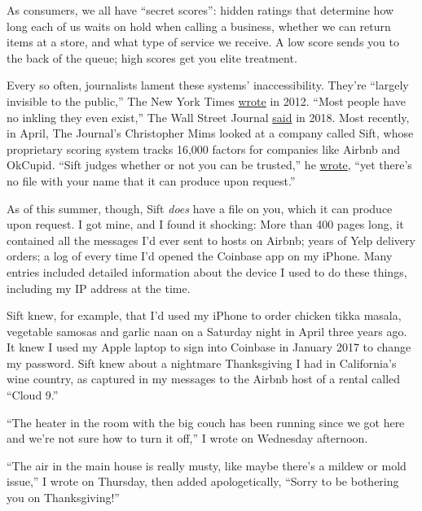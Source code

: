 As consumers, we all have ``secret scores'': hidden ratings that
determine how long each of us waits on hold when calling a business,
whether we can return items at a store, and what type of service we
receive. A low score sends you to the back of the queue; high scores get
you elite treatment.

Every so often, journalists lament these systems' inaccessibility.
They're ``largely invisible to the public,'' The New York Times
\href{https://www.nytimes3xbfgragh.onion/2012/08/19/business/electronic-scores-rank-consumers-by-potential-value.html}{wrote}
in 2012. ``Most people have no inkling they even exist,'' The Wall
Street Journal
\href{https://www.wsj.com/articles/on-hold-for-45-minutes-it-might-be-your-secret-customer-score-1541084656}{said}
in 2018. Most recently, in April, The Journal's Christopher Mims looked
at a company called Sift, whose proprietary scoring system tracks 16,000
factors for companies like Airbnb and OkCupid. ``Sift judges whether or
not you can be trusted,'' he
\href{https://www.wsj.com/articles/the-secret-trust-scores-companies-use-to-judge-us-all-11554523206}{wrote},
``yet there's no file with your name that it can produce upon request.''

As of this summer, though, Sift \emph{does} have a file on you, which it
can produce upon request. I got mine, and I found it shocking: More than
400 pages long, it contained all the messages I'd ever sent to hosts on
Airbnb; years of Yelp delivery orders; a log of every time I'd opened
the Coinbase app on my iPhone. Many entries included detailed
information about the device I used to do these things, including my IP
address at the time.

Sift knew, for example, that I'd used my iPhone to order chicken tikka
masala, vegetable samosas and garlic naan on a Saturday night in April
three years ago. It knew I used my Apple laptop to sign into Coinbase in
January 2017 to change my password. Sift knew about a nightmare
Thanksgiving I had in California's wine country, as captured in my
messages to the Airbnb host of a rental called ``Cloud 9.''

``The heater in the room with the big couch has been running since we
got here and we're not sure how to turn it off,'' I wrote on Wednesday
afternoon.

``The air in the main house is really musty, like maybe there's a mildew
or mold issue,'' I wrote on Thursday, then added apologetically, ``Sorry
to be bothering you on Thanksgiving!''

